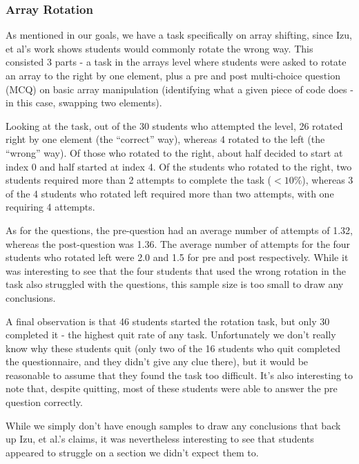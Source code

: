 \documentclass[11pt]{article}
\begin{document}
\subsubsection{Array Rotation}
As mentioned in our goals, we have a task specifically on array shifting, since Izu, et al\cite{izuloop}'s work shows students would commonly rotate the wrong way. This consisted 3 parts - a task in the arrays level where students were asked to rotate an array to the right by one element, plus a pre and post multi-choice question (MCQ) on basic array manipulation (identifying what a given piece of code does - in this case, swapping two elements).\par
Looking at the task, out of the 30 students who attempted the level, 26 rotated right by one element (the ``correct'' way), whereas 4 rotated to the left (the ``wrong'' way). Of those who rotated to the right, about half decided to start at index 0 and half started at index 4. Of the students who rotated to the right, two students required more than 2 attempts to complete the task ($<10\%$), whereas 3 of the 4 students who rotated left required more than two attempts, with one requiring 4 attempts.\par
As for the questions, the pre-question had an average number of attempts of 1.32, whereas the post-question was 1.36. The average number of attempts for the four students who rotated left were 2.0 and 1.5 for pre and post respectively. While it was interesting to see that the four students that used the wrong rotation in the task also struggled with the questions, this sample size is too small to draw any conclusions.\par
A final observation is that 46 students started the rotation task, but only 30 completed it - the highest quit rate of any task. Unfortunately we don't really know why these students quit (only two of the 16 students who quit completed the questionnaire, and they didn't give any clue there), but it would be reasonable to assume that they found the task too difficult. It's also interesting to note that, despite quitting, most of these students were able to answer the pre question correctly.\par
While we simply don't have enough samples to draw any conclusions that back up Izu, et al.'s claims, it was nevertheless interesting to see that students appeared to struggle on a section we didn't expect them to.
\end{document}
